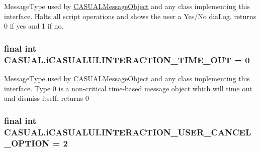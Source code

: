 Message\-Type used by \hyperlink{class_c_a_s_u_a_l_1_1_c_a_s_u_a_l_message_object}{C\-A\-S\-U\-A\-L\-Message\-Object} and any class implementing this interface. Halts all script operations and shows the user a Yes/\-No dia\-Log. returns 0 if yes and 1 if no. \hypertarget{interface_c_a_s_u_a_l_1_1i_c_a_s_u_a_l_u_i_a1300f3c7c9d2856291cab7f83e5d250f}{
\subsubsection[{I\-N\-T\-E\-R\-A\-C\-T\-I\-O\-N\-\_\-\-T\-I\-M\-E\-\_\-\-O\-U\-T}]{\setlength{\rightskip}{0pt plus 5cm}final int C\-A\-S\-U\-A\-L.\-i\-C\-A\-S\-U\-A\-L\-U\-I.\-I\-N\-T\-E\-R\-A\-C\-T\-I\-O\-N\-\_\-\-T\-I\-M\-E\-\_\-\-O\-U\-T = 0}}\label{interface_c_a_s_u_a_l_1_1i_c_a_s_u_a_l_u_i_a1300f3c7c9d2856291cab7f83e5d250f}
Message\-Type used by \hyperlink{class_c_a_s_u_a_l_1_1_c_a_s_u_a_l_message_object}{C\-A\-S\-U\-A\-L\-Message\-Object} and any class implementing this interface. Type 0 is a non-\/critical time-\/based message object which will time out and dismiss itself. returns 0 \hypertarget{interface_c_a_s_u_a_l_1_1i_c_a_s_u_a_l_u_i_acfd8f207fba42b0a192a88ab6184357a}{
\subsubsection[{I\-N\-T\-E\-R\-A\-C\-T\-I\-O\-N\-\_\-\-U\-S\-E\-R\-\_\-\-C\-A\-N\-C\-E\-L\-\_\-\-O\-P\-T\-I\-O\-N}]{\setlength{\rightskip}{0pt plus 5cm}final int C\-A\-S\-U\-A\-L.\-i\-C\-A\-S\-U\-A\-L\-U\-I.\-I\-N\-T\-E\-R\-A\-C\-T\-I\-O\-N\-\_\-\-U\-S\-E\-R\-\_\-\-C\-A\-N\-C\-E\-L\-\_\-\-O\-P\-T\-I\-O\-N = 2}}\label{interface_c_a_s_u_a_l_1_1i_c_a_s_u_a_l_u_i_acfd8f207fba42b0a192a88ab6184357a}
